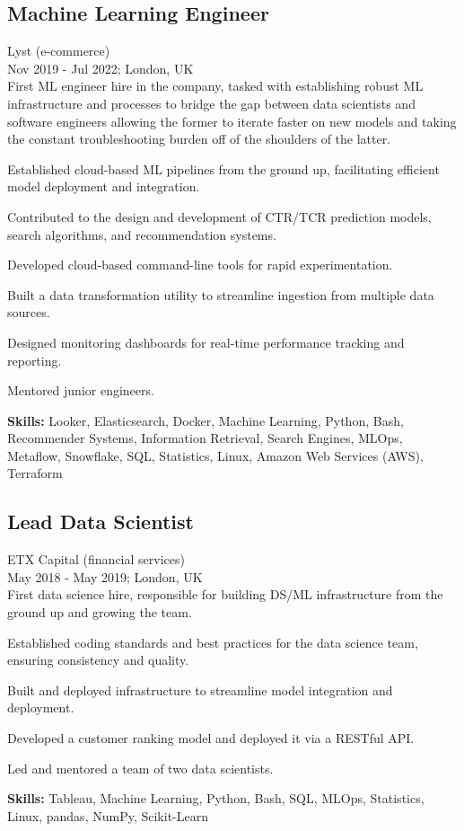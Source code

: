 \documentclass[a4paper,10pt]{article}
\begin{document}
\subsection*{Machine Learning Engineer}
Lyst (e-commerce) \\
Nov 2019 - Jul 2022; London, UK \\
First ML engineer hire in the company, tasked with establishing robust ML infrastructure and processes to bridge the gap between data scientists and software engineers allowing the former to iterate faster on new models and taking the constant troubleshooting burden off of the shoulders of the latter.
\begin{bulletlist}
    \item Established cloud-based ML pipelines from the ground up, facilitating efficient model deployment and integration.
    \item Contributed to the design and development of CTR/TCR prediction models, search algorithms, and recommendation systems.
    \item Developed cloud-based command-line tools for rapid experimentation.
    \item Built a data transformation utility to streamline ingestion from multiple data sources.
    \item Designed monitoring dashboards for real-time performance tracking and reporting.
    \item Mentored junior engineers.
\end{bulletlist}
\textbf{Skills:} Looker, Elasticsearch, Docker, Machine Learning, Python, Bash, Recommender Systems, Information Retrieval, Search Engines, MLOps, Metaflow, Snowflake, SQL, Statistics, Linux, Amazon Web Services (AWS), Terraform

\subsection*{Lead Data Scientist}
ETX Capital (financial services) \\
May 2018 - May 2019; London, UK \\
First data science hire, responsible for building DS/ML infrastructure from the ground up and growing the team.
\begin{bulletlist}
    \item Established coding standards and best practices for the data science team, ensuring consistency and quality.
    \item Built and deployed infrastructure to streamline model integration and deployment.
    \item Developed a customer ranking model and deployed it via a RESTful API.
    \item Led and mentored a team of two data scientists.
\end{bulletlist}
\textbf{Skills: }Tableau, Machine Learning, Python, Bash, SQL, MLOps, Statistics, Linux, pandas, NumPy, Scikit-Learn
\end{document}
